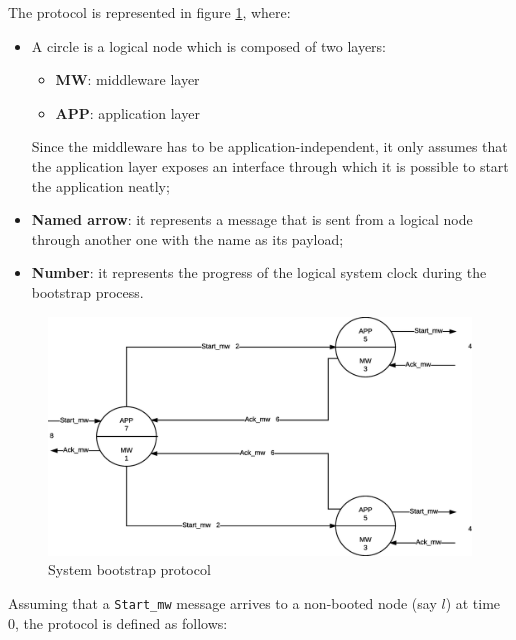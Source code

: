 The protocol is represented in figure \ref{fig:sys-bootstrap-protocol}, where:

\begin{itemize}
  \item A circle is a logical node which is composed of two layers:
    \begin{itemize}
      \item \textbf{MW}:  middleware layer
      \item \textbf{APP}: application layer
  \end{itemize}
    Since the middleware has to be application-independent, it only assumes
    that the application layer exposes an interface through which it is
    possible to start the application neatly;
  \item \textbf{Named arrow}: it represents a message that is sent from a
logical node through another one with the name as its payload;
  \item \textbf{Number}: it represents the progress of the logical system clock
during the bootstrap process.
\end{itemize}

\begin{figure}[H]
  \centering
  \includegraphics[width=\columnwidth]{images/solution/bootstrap.eps}
  \caption{System bootstrap protocol}
  \label{fig:sys-bootstrap-protocol}
\end{figure}

Assuming that a \texttt{Start\_mw} message arrives to a non-booted node (say
$l$) at time 0, the protocol is defined as follows:

